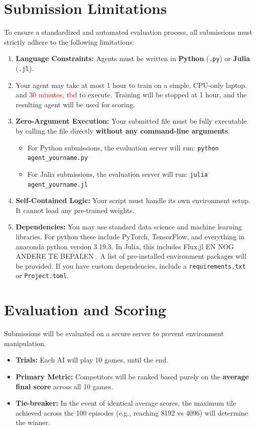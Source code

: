 \documentclass[11pt]{article}
\begin{document}
\section{Submission Limitations}
To ensure a standardized and automated evaluation process, all submissions must strictly adhere to the following limitations:
\begin{enumerate}
    \item \textbf{Language Constraints:} Agents must be written in \textbf{Python} (\texttt{.py}) or \textbf{Julia} (\texttt{.jl}). 
    \item Your agent may take at most 1 hour to train on a simple, CPU-only laptop. and \textcolor{red}{30 minutes, tbd} to execute. Training will be stopped at 1 hour, and the resulting agent will be used for scoring.
    \item \textbf{Zero-Argument Execution:} Your submitted file must be fully executable by calling the file directly \textbf{without any command-line arguments}.
    \begin{itemize}
        \item For Python submissions, the evaluation server will run: \texttt{python agent\_yourname.py}
        \item For Julia submissions, the evaluation server will run: \texttt{julia agent\_yourname.jl}
    \end{itemize}
    \item \textbf{Self-Contained Logic:} Your script must handle its own environment setup. It cannot load any pre-trained weights.
    \item \textbf{Dependencies:} You may use standard data science and machine learning libraries. For python these include PyTorch, TensorFlow, and everything in anaconda python version 3.19.3. In Julia, this includes Flux.jl EN NOG ANDERE TE BEPALEN . A list of pre-installed environment packages will be provided. If you have custom dependencies, include a \texttt{requirements.txt} or \texttt{Project.toml}.
\end{enumerate}

\section{Evaluation and Scoring}
Submissions will be evaluated on a secure server to prevent environment manipulation. 
\begin{itemize}
    \item \textbf{Trials:} Each AI will play 10 games, until the end.
    \item \textbf{Primary Metric:} Competitors will be ranked based purely on the \textbf{average final score} across all 10 games.
    \item \textbf{Tie-breaker:} In the event of identical average scores, the maximum tile achieved across the 100 episodes (e.g., reaching 8192 vs 4096) will determine the winner.
\end{itemize}
\end{document}
